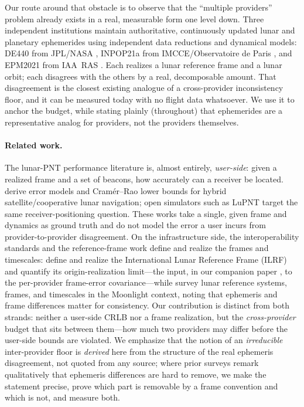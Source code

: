 Our route around that obstacle is to observe that the ``multiple providers'' problem
already exists in a real, measurable form one level down. Three independent
institutions maintain authoritative, continuously updated lunar and planetary
ephemerides using independent data reductions and dynamical models: DE440 from
JPL/NASA \citep{park2021de440}, INPOP21a from IMCCE/Observatoire de Paris
\citep{fienga2021inpop21a}, and EPM2021 from IAA~RAS \citep{pitjeva2021epm2021}. Each
realizes a lunar reference frame and a lunar orbit; each disagrees with the others by
a real, decomposable amount. That disagreement is the closest existing analogue of a
cross-provider inconsistency floor, and it can be measured today with no flight data
whatsoever. We use it to anchor the budget, while stating plainly (throughout) that
ephemerides are a representative analog for providers, not the providers themselves.

\paragraph{Related work.}
The lunar-PNT performance literature is, almost entirely, \emph{user-side}: given a
realized frame and a set of beacons, how accurately can a receiver be located.
\citet{pohlmann2025hybrid} derive error models and Cram\'er--Rao lower bounds for
hybrid satellite/cooperative lunar navigation; open simulators such as LuPNT
\citep{iiyama2023lupnt} target the same receiver-positioning question. These works
take a single, given frame and dynamics as ground truth and do not model the error a
user incurs from provider-to-provider disagreement. On the infrastructure side, the
interoperability standards \citep{lnis2023,ioag2022lunar,israel2020lunanet} and the
reference-frame work define and realize the frames and timescales:
\citet{sosnica2025ilrf} define and realize the International Lunar Reference Frame
(ILRF) and quantify its origin-realization limit---the input, in our companion paper
\citep{baweja2026datum}, to the per-provider frame-error covariance---while
\citet{fienga2024moonlight} survey lunar reference systems, frames, and timescales
in the Moonlight context, noting that ephemeris and frame differences matter for
consistency. Our contribution is distinct from both strands: neither a user-side CRLB
nor a frame realization, but the \emph{cross-provider} budget that sits between
them---how much two providers may differ before the user-side bounds are violated. We
emphasize that the notion of an \emph{irreducible} inter-provider floor is
\emph{derived} here from the structure of the real ephemeris disagreement, not quoted
from any source; where prior surveys remark qualitatively that ephemeris differences
are hard to remove, we make the statement precise, prove which part is removable by a
frame convention and which is not, and measure both.

